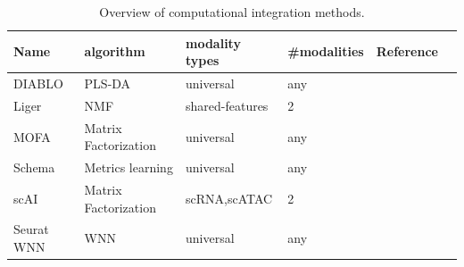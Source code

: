 \begin{table}[!ht]
	\small
	\centering
	\begin{tabular}{llllll}
		\toprule
		Name & algorithm & modality types & \#modalities & Reference \\
		\midrule
    DIABLO & PLS-DA & universal & any & \cite{singh2019diablo}\\
    Liger & NMF & shared-features& 2 & \cite{kriebel2021nonnegative} \\
		MOFA   &  Matrix Factorization & universal & any &  \cite{argelaguet2020mofa+} \\
		Schema & Metrics learning  & universal & any & \cite{singh2021schema} \\
    scAI & Matrix Factorization & scRNA,scATAC & 2 & \cite{jin2020scai}\\
		Seurat WNN	 & WNN & universal & any & \cite{hao2021seurat4} \\
		\bottomrule
	\end{tabular}
	\vspace{0.1cm}
	\caption[Overview of computational integration methods]{Overview of computational integration methods.}
	\label{tab:methods_integration_overview}
\end{table}

